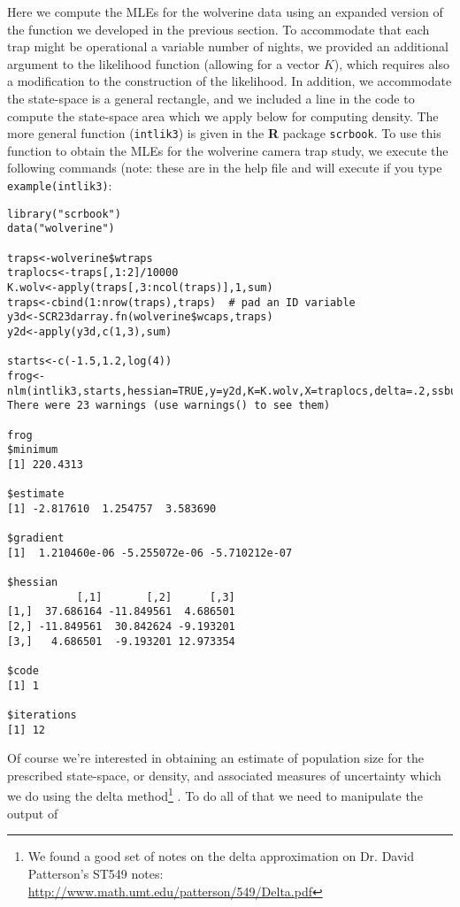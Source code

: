 Here we compute the MLEs for the wolverine data using an expanded
version of the function we developed in the previous section. To
accommodate that each trap might be operational a variable number of
nights, we provided an additional argument to the likelihood function
(allowing for a vector $K$), which requires also a modification to the
construction of the likelihood.  In addition,
we accommodate  the state-space is a general rectangle, and
we included a line in the code to compute the state-space area which
we apply below for computing density.  The more general function
(\mbox{\tt intlik3}) is given in the {\bf R} package \mbox{\tt scrbook}. 
To use this function to obtain the MLEs for the wolverine camera trap
study, we execute the following commands (note: these are in the help
file and will execute if you type \mbox{\tt example(intlik3)}:
{\small
\begin{verbatim}
library("scrbook")
data("wolverine")
 
traps<-wolverine$wtraps
traplocs<-traps[,1:2]/10000
K.wolv<-apply(traps[,3:ncol(traps)],1,sum)
traps<-cbind(1:nrow(traps),traps)  # pad an ID variable
y3d<-SCR23darray.fn(wolverine$wcaps,traps)
y2d<-apply(y3d,c(1,3),sum)

starts<-c(-1.5,1.2,log(4))
frog<-nlm(intlik3,starts,hessian=TRUE,y=y2d,K=K.wolv,X=traplocs,delta=.2,ssbuffer=2)
There were 23 warnings (use warnings() to see them)

frog
$minimum
[1] 220.4313

$estimate
[1] -2.817610  1.254757  3.583690

$gradient
[1]  1.210460e-06 -5.255072e-06 -5.710212e-07

$hessian
           [,1]       [,2]      [,3]
[1,]  37.686164 -11.849561  4.686501
[2,] -11.849561  30.842624 -9.193201
[3,]   4.686501  -9.193201 12.973354

$code
[1] 1

$iterations
[1] 12
\end{verbatim}
}
Of course we're interested in obtaining an estimate of population size
for the prescribed state-space, or density, and associated measures of
uncertainty which we do using the delta method\footnote{
We found a good set of notes on the delta approximation on Dr. David
Patterson's ST549 notes: 
\url{http://www.math.umt.edu/patterson/549/Delta.pdf}
}
\citep[][Appendix F4]{williams_etal:2002}.
To do all of that we need to manipulate the output of
